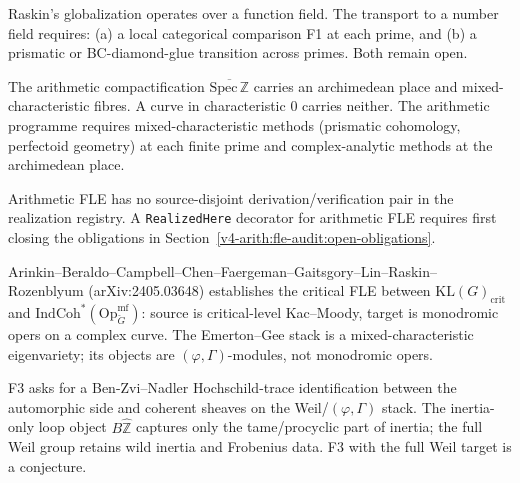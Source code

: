 \begin{remark}
\label{v4-arith:fle-audit:rem:function-field-transport}
Raskin's globalization operates over a function field. The transport
to a number field requires: (a) a local categorical comparison F1 at
each prime, and (b) a prismatic or BC-diamond-glue transition across
primes. Both remain open.
\end{remark}

\begin{remark}
\label{v4-arith:fle-audit:rem:mixed-char-substrate}
The arithmetic compactification
\(\overline{\mathrm{Spec}\,\mathbb{Z}}\) carries an archimedean place
and mixed-characteristic fibres. A curve in characteristic \(0\)
carries neither. The arithmetic programme requires mixed-characteristic
methods (prismatic cohomology, perfectoid geometry) at each finite
prime and complex-analytic methods at the archimedean place.
\end{remark}

\begin{remark}
\label{v4-arith:fle-audit:rem:hz-iv-status}
Arithmetic FLE has no source-disjoint derivation/verification pair in
the realization registry. A \texttt{RealizedHere} decorator for
arithmetic FLE requires first closing the obligations in
Section~\ref{v4-arith:fle-audit:open-obligations}.
\end{remark}

\begin{remark}
\label{v4-arith:fle-audit:rem:agkrrv-target}
Arinkin--Beraldo--Campbell--Chen--Faergeman--Gaitsgory--Lin--Raskin--%
Rozenblyum (arXiv:2405.03648) establishes the critical FLE between
\(\mathrm{KL}(G)_{\mathrm{crit}}\) and
\(\mathrm{IndCoh}^{*}(\mathrm{Op}^{\mathrm{mf}}_{\check G})\): source
is critical-level Kac--Moody, target is monodromic opers on a complex
curve. The Emerton--Gee stack is a mixed-characteristic eigenvariety;
its objects are \((\varphi,\Gamma)\)-modules, not monodromic opers.
\end{remark}

\begin{remark}
\label{v4-arith:fle-audit:rem:f3-bzn}
F3 asks for a Ben-Zvi--Nadler Hochschild-trace identification between
the automorphic side and coherent sheaves on the Weil/\((\varphi,\Gamma)\)
stack. The inertia-only loop object
\(B\widehat{\mathbb{Z}}\) captures only the tame/procyclic part of
inertia; the full Weil group retains wild inertia and Frobenius data.
F3 with the full Weil target is a conjecture.
\end{remark}

